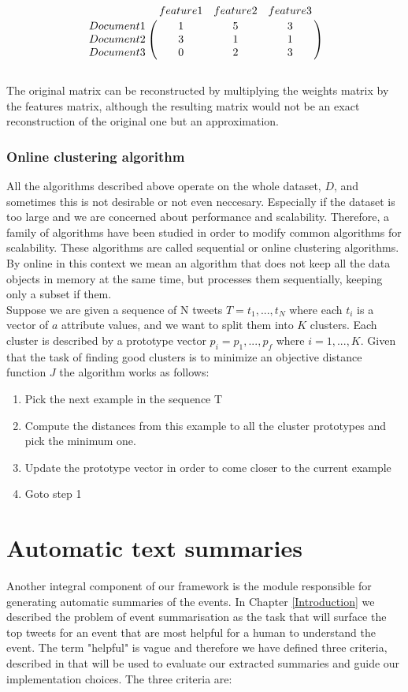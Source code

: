 \[
\bordermatrix{~ & feature 1 & feature 2 & feature 3\cr
                  Document 1 & 1 & 5 & 3\cr
                  Document 2 & 3 & 1 & 1\cr
                  Document 3 & 0 & 2 & 3\cr}
\] \\
The original matrix can be reconstructed by multiplying the weights matrix by the features matrix, although the resulting matrix would not be an exact reconstruction of the original one but an approximation. 

\subsubsection{Online clustering algorithm}
All the algorithms described above operate on the whole dataset, $D$, and sometimes this is not desirable or not even neccesary. Especially if the dataset is too large and we are concerned about performance and scalability. Therefore, a family of algorithms have been studied in order to modify common algorithms for scalability. These algorithms are called sequential or online clustering algorithms. By online in this context we mean an algorithm that does not keep all the data objects in memory at the same time, but processes them sequentially, keeping only a subset if them.\\
Suppose we are given a sequence of N tweets $T = {t_1, ..., t_N}$ where each $t_i$ is a vector of $a$ attribute values, and we want to split them into $K$ clusters. Each cluster is described by a prototype vector $p_i = {p_1, ..., p_f}$ where $i = 1, ..., K$. Given that the task of finding good clusters is to minimize an objective distance function $J$ the algorithm works as follows:
\begin{enumerate}
   \item Pick the next example in the sequence T
   \item Compute the distances from this example to all the cluster prototypes and pick the minimum one.
   \item Update the prototype vector in order to come closer to the current example  
   \item Goto step 1  
 \end{enumerate} 

\section{Automatic text summaries}\label{SummaryGen}

Another integral component of our framework is the module responsible for generating automatic summaries of the events. In Chapter \ref{Introduction}
we described the problem of event summarisation as the task that will surface the top tweets for an event that are most helpful for a human to understand the event.
The term "helpful" is vague and therefore we have defined three criteria, described in \citep{conf/icwsm/BeckerNG11a} that will be used to evaluate our extracted summaries and guide our implementation choices. The three criteria are:

